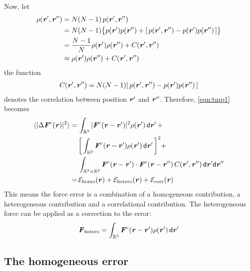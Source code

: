 \documentclass[aps,pre,preprint,unsortedaddress]{revtex4}
\renewcommand{\v}[1]{\textbf{\textit{#1}}}
\renewcommand{\d}[1]{\textsf{#1}}
\begin{document}
Now, let
\begin{align} \nonumber
  \rho(\v r', \v r'')
  & = N (N-1) \,p(\v r', \v r'') \\\nonumber
  & = N (N-1) \big\{ p(\v r')p(\v r'') + [\,p(\v r', \v r'') -  p(\v r')p(\v r'')\,]\big\} \\\nonumber
  &= \frac{N-1}N \rho(\v r')\rho(\v r'') + C (\v r', \v r'')\\ \label{eqn:tmp5}
  &\approx \rho(\v r')\rho(\v r'') + C (\v r', \v r'')
\end{align}
the function
\begin{align}
C (\v r', \v r'') = N (N-1) [\,p(\v r', \v r'') -  p(\v r')p(\v r'')\,]
\end{align}
denotes the correlation between
position $\v r'$ and $\v r''$. Therefore, \eqref{eqn:tmp1} becomes
\begin{align} \nonumber
  \langle\vert\Delta\v F^c(\v r)\vert^2\rangle
  = &\,
  \int_{\mathbb R^3}\vert\v F^c(\v r - \v r')\vert^2\rho(\v r')\,\d d\v r' \,+ \\\nonumber
  &\,
  \bigg[\int_{\mathbb R^3}\v F^c(\v r - \v r')\rho(\v r')\,\d d\v r'\,\bigg]^2 + \\\nonumber
  &\,
  \int_{\mathbb R^3\times\mathbb R^3}\v F^c(\v r - \v r')\cdot\v F^c(\v r - \v r'')\,C(\v r', \v r'')\,\d d\v r'\d d\v r'' \\\label{eqn:tmp5}
  = &\,
  \mathcal E_{\textrm{homo}}(\v r) + \mathcal E_{\textrm{hetero}}(\v r) + \mathcal E_{\textrm{corr}}(\v r)
\end{align}
This means the force error is a combination of a homogeneous
contribution, a heterogeneous contribution and a correlational
contribution. The heterogeneous force can be applied as a correction
to the error:
\begin{align}\label{eqn:tmp7}
  \v F_{\textrm{hetero}} = \int_{\mathbb R^3}\v F^c(\v r - \v r')\rho(\v r')\,\d d\v r'
\end{align}


\subsection{The homogeneous error}
\end{document}
